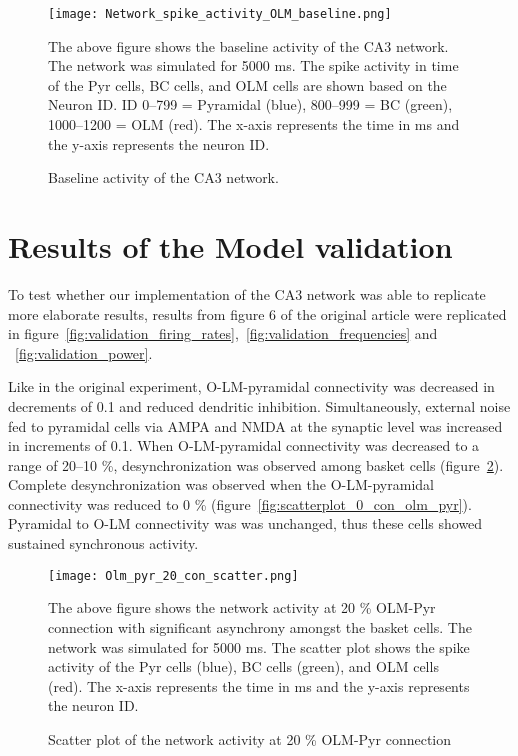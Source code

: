 \begin{figure}[htbp]
    \centering
    \texttt{[image: Network\_spike\_activity\_OLM\_baseline.png]}
    \caption[Baseline activity of the CA3 network]{Baseline activity of the CA3 network.}\label{fig:baseline_activity}
    \begin{minipage}{0.9\textwidth}
        The above figure shows the baseline activity of the CA3 network. The network was simulated for 5000 ms. 
        The spike activity in time of the Pyr cells, BC cells, and OLM cells are shown based on the Neuron ID\@. 
        ID 0--799 = Pyramidal (blue), 800--999 = BC (green), 1000--1200 = OLM (red). 
        The x-axis represents the time in ms and the y-axis represents the neuron ID\@.
    \end{minipage}
\end{figure}
\pagebreak
\section{Results of the Model validation}
To test whether our implementation of the CA3 network was able to replicate
more elaborate results, results from figure 6 of the original
\textcite{sanjayImpairedDendriticInhibition2015} article were replicated in
figure~\ref{fig:validation_firing_rates},~\ref{fig:validation_frequencies} and
~\ref{fig:validation_power}.

Like in the original experiment, O-LM-pyramidal connectivity was decreased in decrements of 0.1 and reduced dendritic inhibition.
Simultaneously, external noise fed to pyramidal cells via AMPA and NMDA at the synaptic level was increased in increments of 0.1. 
When O-LM-pyramidal connectivity was decreased to a range of 20--10 \%, desynchronization was observed among basket cells (figure~\ref{fig:scatterplot_20_con_olm_pyr}).
Complete desynchronization was observed when the O-LM-pyramidal connectivity was reduced to 0 \% (figure~\ref{fig:scatterplot_0_con_olm_pyr}).
Pyramidal to O-LM connectivity was was unchanged, thus these cells showed sustained synchronous activity.

\begin{figure}[htbp]
    \centering
    \texttt{[image: Olm\_pyr\_20\_con\_scatter.png]}
    \caption[20 \% OLM-Pyr connection scatter plot]{Scatter plot of the network activity at 20 \% OLM-Pyr connection}\label{fig:scatterplot_20_con_olm_pyr}
    \begin{minipage}{0.9\textwidth}
        The above figure shows the network activity at 20 \% OLM-Pyr connection with significant asynchrony amongst the basket cells.
        The network was simulated for 5000 ms. 
        The scatter plot shows the spike activity of the Pyr cells (blue), BC cells (green), and OLM cells (red). 
        The x-axis represents the time in ms and the y-axis represents the neuron ID\@. 
    \end{minipage}
\end{figure}

